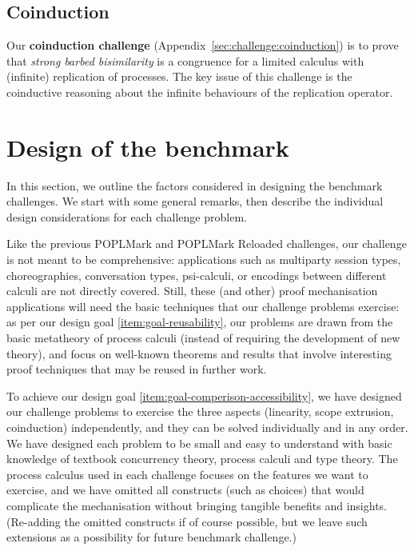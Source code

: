\documentclass[runningheads]{llncs}
\begin{document}
\subsection{Coinduction}
Our \textbf{coinduction challenge} (Appendix~\ref{sec:challenge:coinduction}) is to prove that \emph{strong barbed bisimilarity} is a congruence for a limited calculus with (infinite) replication of processes.
The key issue of this challenge is the coinductive reasoning about the infinite behaviours of the replication operator.

\section{Design of the benchmark}\label{sec:design-discussion}

In this section, we outline the factors considered in designing the
benchmark challenges. We start with some general remarks, then
describe the individual design considerations for each challenge
problem.

Like the previous POPLMark and POPLMark Reloaded challenges, our challenge is not meant to be comprehensive: applications such as multiparty session types, choreographies, conversation types, psi-calculi, or encodings between different calculi are not directly covered.  Still, these (and other) proof mechanisation applications will need the basic techniques that our challenge problems exercise:
as per our design goal \ref{item:goal-reusability},
our problems are drawn from the basic metatheory of process calculi (instead
of requiring the development of new theory), and focus on well-known theorems
and results that involve interesting proof techniques that may be reused in further work.

To achieve our design goal \ref{item:goal-comperison-accessibility},
we have designed our challenge problems to exercise the three aspects (linearity, scope extrusion, coinduction) independently, and they can be solved individually and in any order.
We have designed each problem to be small and easy to understand with basic knowledge of textbook concurrency theory, process calculi and type theory.  The process calculus used in each challenge
focuses on the features we want to exercise, and we have omitted all constructs
(such as choices) that would complicate the mechanisation without bringing tangible
benefits and insights.  (Re-adding the omitted constructs if of course possible, but we leave
such extensions as a possibility for future benchmark challenge.)
\end{document}
